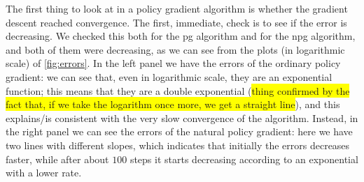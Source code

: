 The first thing to look at in a policy gradient algorithm is whether the gradient descent reached convergence. The first, immediate, check is to see if the error is decreasing. We checked this both for the \acrshort{pg} algorithm and for the \acrshort{npg} algorithm, and both of them were decreasing, as we can see from the plots (in logarithmic scale) of \autoref{fig:errors}. In the left panel we have the errors of the ordinary policy gradient: we can see that, even in logarithmic scale, they are an exponential function; this means that they are a double exponential (\colorbox{yellow}{thing confirmed by the fact that, if we take the logarithm once more, we get a straight line}), and this explains/is consistent with the very slow convergence of the algorithm. Instead, in the right panel we can see the errors of the natural policy gradient: here we have two lines with different slopes, which indicates that initially the errors decreases faster, while after about $100$ steps it starts decreasing according to an exponential with a lower rate.

